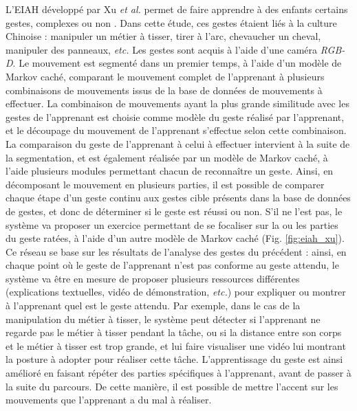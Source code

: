 L'EIAH développé par Xu \textit{et al.} permet de faire apprendre à des enfants certains gestes, complexes ou non \parencite{Xu2019Ptt}. Dans cette étude, ces gestes étaient liés à la culture Chinoise : manipuler un métier à tisser, tirer à l'arc, chevaucher un cheval, manipuler des panneaux, \textit{etc.} Les gestes sont acquis à l'aide d'une caméra \textit{RGB-D}. Le mouvement est segmenté dans un premier temps, à l'aide d'un modèle de Markov caché, comparant le mouvement complet de l'apprenant à plusieurs combinaisons de mouvements issus de la base de données de mouvements à effectuer. La combinaison de mouvements ayant la plus grande similitude avec les gestes de l'apprenant est choisie comme modèle du geste réalisé par l'apprenant, et le découpage du mouvement de l'apprenant s'effectue selon cette combinaison. La comparaison du geste de l'apprenant à celui à effectuer intervient à la suite de la segmentation, et est également réalisée par un modèle de Markov caché, à l'aide plusieurs modules permettant chacun de reconnaître un geste. Ainsi, en décomposant le mouvement en plusieurs parties, il est possible de comparer chaque étape d'un geste continu aux gestes cible présents dans la base de données de gestes, et donc de déterminer si le geste est réussi ou non. S'il ne l'est pas, le système va proposer un exercice permettant de se focaliser sur la ou les parties du geste ratées, à l'aide d'un autre modèle de Markov caché (Fig. \ref{fig:eiah_xu}). Ce réseau se base sur les résultats de l'analyse des gestes du précédent : ainsi, en chaque point où le geste de l'apprenant n'est pas conforme au geste attendu, le système va être en mesure de proposer plusieurs ressources différentes (explications textuelles, vidéo de démonstration, \textit{etc.}) pour expliquer ou montrer à l'apprenant quel est le geste attendu. Par exemple, dans le cas de la manipulation du métier à tisser, le système peut détecter si l'apprenant ne regarde pas le métier à tisser pendant la tâche, ou si la distance entre son corps et le métier à tisser est trop grande, et lui faire visualiser une vidéo lui montrant la posture à adopter pour réaliser cette tâche. L'apprentissage du geste est ainsi amélioré en faisant répéter des parties spécifiques à l'apprenant, avant de passer à la suite du parcours. De cette manière, il est possible de mettre l'accent sur les mouvements que l'apprenant a du mal à réaliser.

